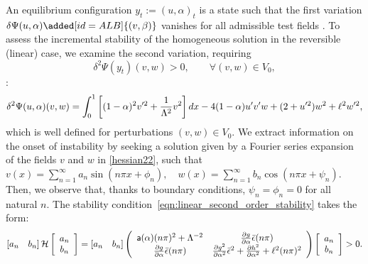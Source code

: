 An equilibrium configuration $y_t:=(u,\alpha)_t$ is a state such that the first variation $\delta \Psi(u,\alpha)\added[id=ALB]{(v, \beta)}$ vanishes for all admissible test fields . 
To assess the incremental stability of the homogeneous solution in the reversible (linear) case, we examine the  second variation, requiring
\begin{equation}
\delta^2 \Psi(y_t)(v,w)>0, \qquad  \forall (v,w)\in V_0,
\label{eqn:linear_second_order_stability}
\end{equation} 
  :
\begin{equation}
\delta^2 \Psi(u,\alpha)(v,w)=\int_0^1 \left[(1-\alpha)^2v'^2 
+\frac{1}{\Lambda^2} v^2 \right]dx
- 4(1-\alpha)u' v'w+(2+ u'^2)w^2+\ell^2w'^2, 
\label{hessian22}
\end{equation}
which is well defined for perturbations $(v, w)\in V_0$.
{We} extract information on the onset of instability by seeking a solution given by a Fourier series expansion of the fields $v$ and $w$ in \eqref{hessian22}, such that $v(x)=\sum_{n=1}^{\infty} a_{n} \sin \left(n \pi x+\phi_{n}\right), \quad w(x)=\sum_{n=1}^{\infty} b_{n} \cos \left(n \pi x+\psi_{n}\right)$. Then, we observe that, thanks to boundary conditions, $\psi_{n}=\phi_{n}=0$ for all natural $n$. The stability condition~\eqref{eqn:linear_second_order_stability}  takes the form:
\begin{align}\left[ a_n \quad b_n \right] \mathcal{H} \left[ \begin{array}{c} a_n \\ b_n \end{array} \right]=\left[ a_n \quad b_n \right]\left(
\begin{array}{cc}
\mathsf{a}(\alpha)(n\pi)^2+\Lambda^{-2}  & \frac{\partial g}{\partial \alpha}\bar\epsilon(n\pi)  \\
\frac{\partial g}{\partial \alpha}\bar\epsilon(n\pi)  &   \frac{\partial g^2}{\partial \alpha^2}\bar\epsilon^2+ \frac{\partial h^2}{\partial \alpha^2}+\ell^2(n\pi)^2  \\
\end{array}
\right)\left[ \begin{array}{c} a_n \\ b_n \end{array} \right]>0.\label{hessian1}\end{align}
